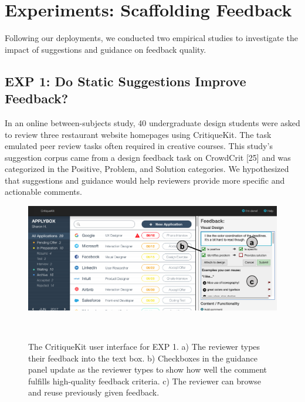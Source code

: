 \section{Experiments: Scaffolding Feedback}
Following our deployments, we conducted two empirical studies to investigate the impact of suggestions and guidance on feedback quality.

\subsection{EXP 1: Do Static Suggestions Improve Feedback?}
In an online between-subjects study, 40 undergraduate design students were asked to review three restaurant website homepages using CritiqueKit. The task emulated peer review tasks often required in creative courses. This study's suggestion corpus came from a design feedback task on CrowdCrit [25] and was categorized in the Positive, Problem, and Solution categories. We hypothesized that suggestions and guidance would help reviewers provide more specific and actionable comments.

\begin{figure}
\centering
  \includegraphics[width=\textwidth]{critiquekit/figures/old_interface.png}
  \caption{The CritiqueKit user interface for EXP 1. a) The reviewer types their feedback into the text box. b) Checkboxes in the guidance panel update as the reviewer types to show how well the comment fulfills high-quality feedback criteria. c) The reviewer can browse and reuse previously given feedback.}~\label{fig:critiquekit_exp1}
\end{figure}

